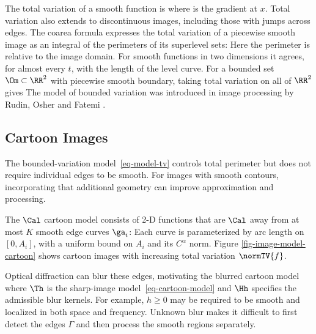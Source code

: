 The total variation of a smooth function is 
where 
is the gradient at $x$. Total variation also extends to discontinuous images, including those with jumps across edges. The coarea formula expresses the total variation of a piecewise smooth image as an integral of the perimeters of its superlevel sets:
Here the perimeter is relative to the image domain. For smooth functions in two dimensions it agrees, for almost every $t$, with the length of the level curve. For a bounded set $\Om\subset\RR^2$ with piecewise smooth boundary, taking total variation on all of $\RR^2$ gives
The model of bounded variation was introduced in image processing by Rudin, Osher and Fatemi \cite{rudin-tv}.

                                           
\subsection{Cartoon Images}
\label{subsec-cartoon-images}

The bounded-variation model~\eqref{eq-model-tv} controls total perimeter but does not require individual edges to be smooth. For images with smooth contours, incorporating that additional geometry can improve approximation and processing.

The $\Cal$ cartoon model consists of 2-D functions that are $\Cal$ away from at most $K$ smooth edge curves $\ga_i$:
Each curve is parameterized by arc length on $[0,A_i]$, with a uniform bound on $A_i$ and its $C^\alpha$ norm.
Figure \ref{fig-image-model-cartoon} shows cartoon images with increasing total variation $\normTV{f}$.


Optical diffraction can blur these edges, motivating the blurred cartoon model
where $\Th$ is the sharp-image model~\eqref{eq-cartoon-model} and $\Hh$ specifies the admissible blur kernels. For example, $h \geq 0$ may be required to be smooth and localized in both space and frequency.
Unknown blur makes it difficult to first detect the edges $\Gamma$ and then process the smooth regions separately.

